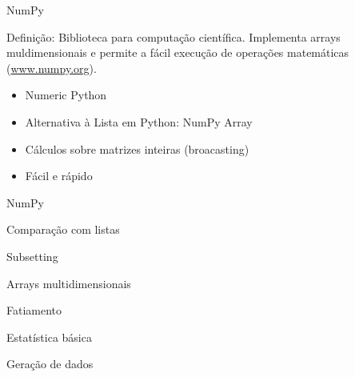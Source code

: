 \begin{frame}[t, fragile]{NumPy}
  \begin{block}{Definição:}
    Biblioteca para computação científica. Implementa arrays muldimensionais e permite a fácil execução de operações matemáticas  (\url{www.numpy.org}). 
  \end{block}
  \begin{itemize}
    \item Numeric Python
    \item Alternativa à Lista em Python: NumPy Array
    \item Cálculos sobre matrizes inteiras (broacasting)
    \item Fácil e rápido
  \end{itemize}
\end{frame}
%
\begin{frame}[t, fragile]{NumPy}
    
\end{frame}
%
\begin{frame}[t, fragile]{Comparação com listas}
    
\end{frame}
%
\begin{frame}[t, fragile]{Subsetting}
    
\end{frame}
%
\begin{frame}[t, fragile]{Arrays multidimensionais}
    
\end{frame}
%
\begin{frame}{Fatiamento}
    
\end{frame}
%
\begin{frame}[t, fragile]{Estatística básica}
    
\end{frame}
%
\begin{frame}[t, fragile]{Geração de dados}
    
\end{frame}
%

 
 